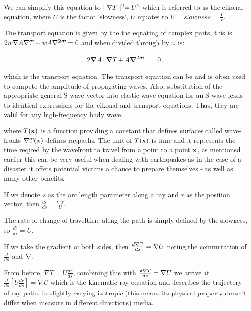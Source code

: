 \documentclass{mm2}
\newcommand{\bnabla}{\boldsymbol{\nabla}}
\begin{document}
\begin{answer}{2}
We can simplify this equation to $\mid {\bf \nabla} T \mid ^2 = U^2$ which is referred to as the eikonal equation, where $U$ is the factor 'slowness', $U$ equates to $U = slowness = \frac{1}{V}$.

The transport equation is given by the the equating of complex parts, this is $2w{\bf \nabla} A {\bf \nabla} T + w A {\bf \nabla^2} T =0$ and when divided through by $\omega$ is:



\begin{eqnarray}
2 \bnabla A \cdot \bnabla T+ A \bnabla^2T &=0\,,
\end{eqnarray}

which is the transport equation. The transport equation can be and is often used to compute the amplitude of propagating waves. Also, substitution of the appropriate general S-wave vector into elastic wave equation for an S-wave leads to identical expressions for the eikonal and transport equations. Thus, they are valid for any high-frequency body wave.

\end{answer}


where $T({\bf x})$ is a function providing a constant that defines surfaces called wave-fronts ${\bf \nabla} T({\bf x})$ defines raypaths. The unit of $T({\bf x})$  is time and it represents the time reqired by the wavefront to travel from a point to a point $\bf x$, as mentioned earlier this can be very useful when dealing with earthquakes as in the case of a disaster it offers potential victims a chance to prepare themselves - as well as many other benefits.

If we denote $s$ as the arc length parameter along a ray and $r$ as the position vector, then $\frac{dr}{ds} = \frac{\nabla T}{U}$.

The rate of change of traveltime along the path is simply defined by the slowness, so $\frac{dt}{ds} = U$.

If we take the gradient of both sides, then $\frac{d{\bf \nabla}T}{ds} = {\bf \nabla} U$ noting the commutation of $\frac{d}{ds}$ and ${\bf \nabla}$.

From before, $\nabla T = U \frac{dr}{ds}$, combining this with $\frac{d{\bf \nabla}T}{ds} = {\bf \nabla} U$ we arrive at $\frac{d}{ds} \left[U \frac{dr}{ds}\right] = \nabla U$ which is the kinematic ray equation and describes the trajectory of ray paths in slightly varying isotropic (this means its physical property doesn't differ when measure in different directions) media.
\end{document}
